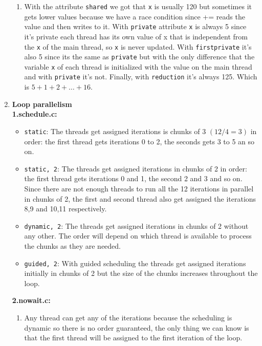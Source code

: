 \begin{enumerate}[label=\textbf{\Alph*)}]
\begin{enumerate}[label=\arabic*.]
        \item With the attribute \texttt{shared} we got that \texttt{x} is usually 120 but sometimes it gets lower values because we have a race condition since += reads the value and then writes to it.
        With \texttt{private} attribute \texttt{x} is always 5 since it's private each thread has its own value of x
        that is independent from the \texttt{x} of the main thread, so \texttt{x} is never updated.
        With \texttt{firstprivate} it's also 5 since its the same as \texttt{private} but with the only difference that the variable \texttt{x} of
        each thread is initialized with the value on the main thread and with \texttt{private} it's not.
        Finally, with \texttt{reduction} it's always 125. Which is $5 + 1 + 2 + \dots + 16$.
    \end{enumerate}
    \pagebreak
    \item \textbf{Loop parallelism} \\
    \textbf{1.schedule.c:}
        \begin{itemize}
            \item[] \texttt{static}: The threads get assigned iterations is chunks of 3 $(12/4=3)$ in order: the first thread gets iterations 0 to 2,
            the seconds gets 3 to 5 an so on.
            \item[] \texttt{static, 2}: The threads get assigned iterations in chunks of 2 in order: the first thread gets iterations 0 and 1,
            the second 2 and 3 and so on. Since there are not enough threads to run all the 12 iterations in parallel in chunks of 2,
            the first and second thread also get assigned the iterations 8,9 and 10,11 respectively.
            \item[] \texttt{dynamic, 2}: The threads get assigned iterations in chunks of 2 without any other. The order will depend on
            which thread is available to process the chunks as they are needed.
            \item[] \texttt{guided, 2}: With guided scheduling the threads get assigned iterations initially in chunks of 2 but the size
            of the chunks increases throughout the loop.
        \end{itemize}
    \textbf{2.nowait.c:}
    \begin{enumerate}[label=\arabic*.]
        \item Any thread can get any of the iterations because the scheduling is dynamic so there is no order guaranteed, the only thing we can know is that the first thread will be assigned to the first iteration of the loop.
        

\end{enumerate}
\end{enumerate}
